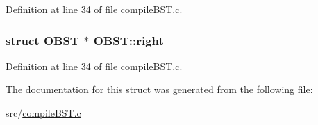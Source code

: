 Definition at line 34 of file compile\-B\-S\-T.\-c.

\hypertarget{structOBST_ab6d8d6c428df9839238a1f666fde3a20}{
\subsubsection[{right}]{\setlength{\rightskip}{0pt plus 5cm}struct {\bf O\-B\-S\-T} $\ast$ O\-B\-S\-T\-::right}}\label{structOBST_ab6d8d6c428df9839238a1f666fde3a20}


Definition at line 34 of file compile\-B\-S\-T.\-c.



The documentation for this struct was generated from the following file\-:\begin{DoxyCompactItemize}
\item 
src/\hyperlink{compileBST_8c}{compile\-B\-S\-T.\-c}\end{DoxyCompactItemize}

